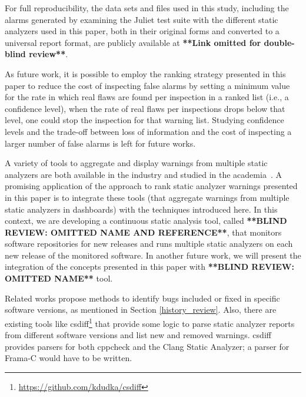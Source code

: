 For full reproducibility, the data sets and files used in this study,
including the alarms generated by examining the Juliet test suite with the
different static analyzers used in this paper, both in their original forms and
converted to a universal report format, are publicly available at
\textbf{**Link omitted for double-blind review**}.

As future work, it is possible to employ the ranking strategy presented in this
paper to reduce the cost of inspecting false alarms by setting a minimum value
for the rate in which real flaws are found per inspection in a ranked list
(i.e., a confidence level), when the rate of real flaws per inspections drops
below that level, one could stop the inspection for that warning list. Studying
confidence levels and the trade-off between loss of information and the cost of
inspecting a larger number of false alarms is left for future works.

A variety of tools to aggregate and display warnings from multiple static
analyzers are both available in the industry and studied in the
academia~\cite{buckers2017uav, heinemann2014teamscale}. A promising application
of the approach to rank static analyzer warnings presented in this paper is to
integrate these tools (that aggregate warnings from multiple static analyzers
in dashboards) with the techniques introduced here. In this context, we are
developing a continuous static analysis tool, called \textbf{**BLIND REVIEW:
OMITTED NAME AND REFERENCE**}, that monitors software repositories for new
releases and runs multiple static analyzers on each new release of the
monitored software.  In another future work, we will present the integration of
the concepts presented in this paper with \textbf{**BLIND REVIEW: OMITTED
NAME**} tool.


Related works propose methods to identify bugs included or fixed in specific
software versions, as mentioned in Section \ref{history_review}.
Also, there are existing tools like
csdiff\footnote{\url{https://github.com/kdudka/csdiff}} that provide some
logic to parse static analyzer reports from different software versions and
list new and removed warnings. csdiff provides parsers for both cppcheck and
the Clang Static Analyzer; a parser for Frama-C would have to be written.

